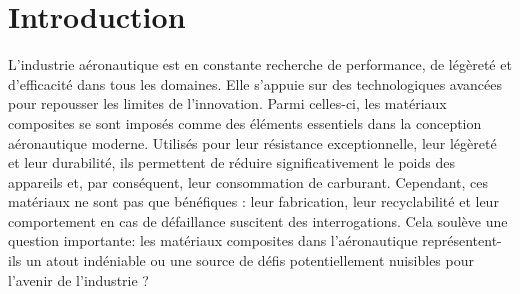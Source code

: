 

\chapter*{Introduction}



L'industrie aéronautique est en constante recherche de performance, de légèreté et d'efficacité dans tous les domaines. Elle s'appuie sur des technologiques avancées pour repousser les limites de l'innovation. Parmi celles-ci, les matériaux composites se sont imposés comme des éléments essentiels dans la conception aéronautique moderne. Utilisés pour leur résistance exceptionnelle, leur légèreté et leur durabilité, ils permettent de réduire significativement le poids des appareils et, par conséquent, leur consommation de carburant. Cependant, ces matériaux ne sont pas que bénéfiques : leur fabrication, leur recyclabilité et leur comportement en cas de défaillance suscitent des interrogations. Cela soulève une question importante: les matériaux composites dans l’aéronautique représentent-ils un atout indéniable ou une source de défis potentiellement nuisibles pour l’avenir de l’industrie ?










